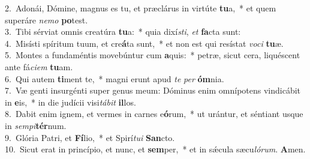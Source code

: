 {2.~}Adonái, Dómine, magnus es tu, et præclárus in virtúte \textbf{tu}a,~* et quem superáre \textit{ne}\textit{mo} \textbf{po}test.\\
{3.~}Tibi sérviat omnis creatúra \textbf{tu}a:~* quia dixí\textit{sti}, \textit{et} \textbf{fa}cta sunt:\\
{4.~}Misísti spíritum tuum, et cre\textbf{á}ta sunt,~* et non est qui resístat \textit{vo}\textit{ci} \textbf{tu}æ.\\
{5.~}Montes a fundaméntis movebúntur cum \textbf{a}quis:~* petræ, sicut cera, liquéscent ante fá\textit{ci}\textit{em} \textbf{tu}am.\\
{6.~}Qui autem \textbf{ti}ment te,~* magni erunt apud \textit{te} \textit{per} \textbf{óm}nia.\\
{7.~}Væ genti insurgénti super genus meum: Dóminus enim omnípotens vindicábit in \textbf{e}is,~* in die judícii visi\textit{tá}\textit{bit} \textbf{il}los.\\
{8.~}Dabit enim ignem, et vermes in carnes e\textbf{ó}rum,~* ut urántur, et séntiant usque in \textit{sem}\textit{pi}\textbf{tér}num.\\
{9.~}Glória Patri, et \textbf{Fí}lio,~* et Spirí\textit{tu}\textit{i} \textbf{San}cto.\\
{10.~}Sicut erat in princípio, et nunc, et \textbf{sem}per,~* et in sǽcula sæcu\textit{ló}\textit{rum}. \textbf{A}men.\\
